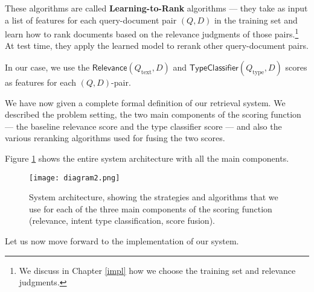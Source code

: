 These algorithms are called \textbf{Learning-to-Rank} algorithms ---
they take as input a list of features for each query-document pair $(Q,D)$ in the training
set and learn how to rank documents based on the
relevance judgments of those pairs.\footnote{We discuss in Chapter \ref{impl} how we choose the training set and relevance judgments.}
At test time, they apply the learned model to rerank other query-document pairs.

In our case, we use the $\textsf{Relevance}(Q_{\text{text}},D)$ and $\textsf{TypeClassifier}(Q_{\text{type}}, D)$
scores as features for each $(Q,D)$-pair.

We have now given a complete formal definition of our retrieval system. We described the problem setting,
the two main components of the scoring function --- the baseline relevance score and the type classifier score ---
and also the various reranking algorithms used for fusing the two scores.

Figure \ref{diagram2} shows the entire system architecture with all the main components.

\begin{figure}
\centerline{
  \texttt{[image: diagram2.png]}
  }
  \caption{System architecture, showing the strategies and algorithms that we use for each of the
  three main components of the scoring function (relevance, intent type classification, score fusion).}
  \label{diagram2}
\end{figure}

Let us now move forward to the implementation of our system.


